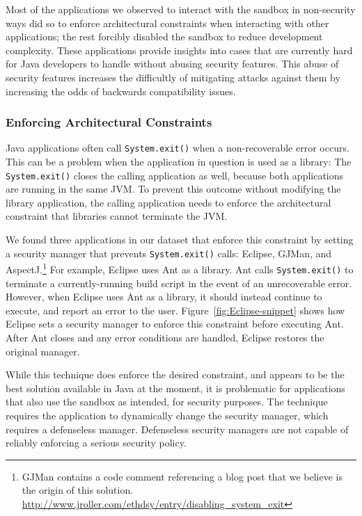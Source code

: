 \documentclass{sig-alternate}
\begin{document}
Most of the applications we observed to interact with the sandbox in
non-security ways did so to enforce architectural constraints when interacting with
other applications; the rest forcibly disabled the sandbox to reduce development
complexity. These applications provide insights into cases that are currently hard for Java developers to handle without abusing security features. This abuse of security features increases the difficultly of mitigating attacks against them by increasing the odds of backwards compatibility issues.

\subsubsection{Enforcing Architectural Constraints}

Java applications often call \texttt{System.exit()} when a non-recoverable
error occurs. This can be a problem when the application in question is 
used as a library: The \texttt{System.exit()} closes the calling
application as well, because both applications
are running in the same JVM. 
To prevent this outcome without modifying the library application,
the calling application needs to enforce the architectural constraint
that libraries cannot terminate the JVM. 

We found three applications in our dataset that 
enforce this constraint by setting a security manager
that prevents \texttt{System.exit()} calls:
Eclipse, GJMan, and AspectJ.\footnote{%
GJMan contains a code comment referencing a
blog post that we believe is the origin of this solution. \url{http://www.jroller.com/ethdsy/entry/disabling_system_exit}}
For example, Eclipse uses Ant as a library.  Ant calls \texttt{System.exit()} to
terminate a currently-running build script in the event of an unrecoverable
error.  However, when Eclipse uses Ant as a library, it
should instead continue to execute, and report an error to the user.
Figure~\ref{fig:Eclipse-snippet} shows
how Eclipse sets a security manager to enforce this constraint
before executing Ant. After Ant closes and any error conditions
are handled, Eclipse restores the original manager.

While this technique does enforce the
desired constraint, and appears to be the best solution available
in Java at the moment, it is problematic for applications that also 
use the sandbox as intended, for security purposes. The technique requires
the application to dynamically change the security manager, which requires a defenseless manager. Defenseless security managers
are not capable of reliably enforcing a serious security policy.
\end{document}
